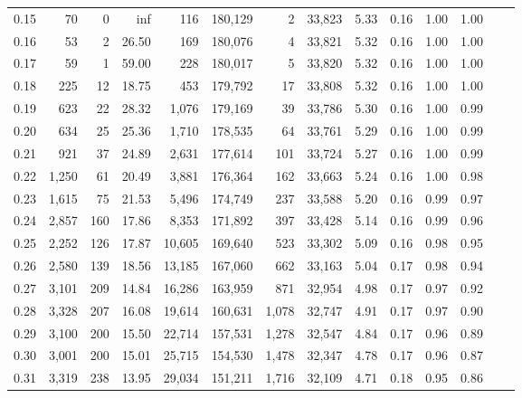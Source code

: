 \begin{tabular}{rrrrrrrrrrrrrr}
0.15 &     70 &      0 &     inf &      116 &  180,129 &       2 &  33,823 &  5.33 &  0.16 &  1.00 &      1.00 \\
0.16 &     53 &      2 &   26.50 &      169 &  180,076 &       4 &  33,821 &  5.32 &  0.16 &  1.00 &      1.00 \\
0.17 &     59 &      1 &   59.00 &      228 &  180,017 &       5 &  33,820 &  5.32 &  0.16 &  1.00 &      1.00 \\
0.18 &    225 &     12 &   18.75 &      453 &  179,792 &      17 &  33,808 &  5.32 &  0.16 &  1.00 &      1.00 \\
0.19 &    623 &     22 &   28.32 &    1,076 &  179,169 &      39 &  33,786 &  5.30 &  0.16 &  1.00 &      0.99 \\
0.20 &    634 &     25 &   25.36 &    1,710 &  178,535 &      64 &  33,761 &  5.29 &  0.16 &  1.00 &      0.99 \\
0.21 &    921 &     37 &   24.89 &    2,631 &  177,614 &     101 &  33,724 &  5.27 &  0.16 &  1.00 &      0.99 \\
0.22 &  1,250 &     61 &   20.49 &    3,881 &  176,364 &     162 &  33,663 &  5.24 &  0.16 &  1.00 &      0.98 \\
0.23 &  1,615 &     75 &   21.53 &    5,496 &  174,749 &     237 &  33,588 &  5.20 &  0.16 &  0.99 &      0.97 \\
0.24 &  2,857 &    160 &   17.86 &    8,353 &  171,892 &     397 &  33,428 &  5.14 &  0.16 &  0.99 &      0.96 \\
0.25 &  2,252 &    126 &   17.87 &   10,605 &  169,640 &     523 &  33,302 &  5.09 &  0.16 &  0.98 &      0.95 \\
0.26 &  2,580 &    139 &   18.56 &   13,185 &  167,060 &     662 &  33,163 &  5.04 &  0.17 &  0.98 &      0.94 \\
0.27 &  3,101 &    209 &   14.84 &   16,286 &  163,959 &     871 &  32,954 &  4.98 &  0.17 &  0.97 &      0.92 \\
0.28 &  3,328 &    207 &   16.08 &   19,614 &  160,631 &   1,078 &  32,747 &  4.91 &  0.17 &  0.97 &      0.90 \\
0.29 &  3,100 &    200 &   15.50 &   22,714 &  157,531 &   1,278 &  32,547 &  4.84 &  0.17 &  0.96 &      0.89 \\
0.30 &  3,001 &    200 &   15.01 &   25,715 &  154,530 &   1,478 &  32,347 &  4.78 &  0.17 &  0.96 &      0.87 \\
0.31 &  3,319 &    238 &   13.95 &   29,034 &  151,211 &   1,716 &  32,109 &  4.71 &  0.18 &  0.95 &      0.86 \\

\end{tabular}
